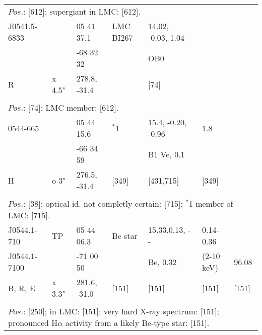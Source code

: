 \documentclass{aa}
\begin{document}
\begin{table*}[h]
\begin{tabular}{p{2.5cm}p{1cm}p{1.8cm}p{2.3cm}p{3.3cm}p{2.0cm}p{2.2cm}}
\\
\multicolumn{7}{p{17.5cm}}{
$Pos$.: [612]; supergiant in LMC: [612].    }\\

\noalign{\smallskip}
\hline
\noalign{\smallskip}
J0541.5-6833    &                &  05 41 37.1    & LMC BI267    & 14.02, -0.03,-1.04   &  &  \\
                             &                & -68 32 32       &                          & OB0                         &      &   \\                                 
     R                     & x 4.5"    & 278.8, -31.4   &                           &       [74]                       &   &   \\
  
\\
\multicolumn{7}{p{17.5cm}}{
$Pos$.: [74]; LMC member: [612].      }\\

\noalign{\smallskip}
\hline
\noalign{\smallskip}
 0544-665     &             & 05 44 15.6     & $^*$1        & 15.4, -0.20, -0.96  &  1.8         &           \\
                       &             & -66 34 59       &                   & B1 Ve, 0.1             &                 &           \\
H                    &  o 3"   & 276.5, -31.4   &  [349]        &    [431,715]          &  [349]     &           \\
\\
\multicolumn{7}{p{17.5cm}}{
$Pos$.: [38]; optical id. not completly certain: [715]; $^*$1 member of LMC: [715].}\\

\noalign{\smallskip}
\hline
\noalign{\smallskip}
J0544.1-710   &   TP        &  05 44 06.3   &  Be star   & 15.33,0.13, - -  &    0.14-0.36              &             \\
J0544.1-7100 &                & -71 00 50      &                    &  Be, 0.32          &    (2-10 keV)             & 96.08  \\
B, R, E             &  x 3.3"   & 281.6, -31.0   & [151]              & [151]             &      [151]                     &   [151]    \\
  
\\
\multicolumn{7}{p{17.5cm}}{
$Pos$.: [250]; in LMC: [151]; very hard X-ray spectrum: [151]; pronounced H$\alpha$ activity from a likely 
Be-type star: [151].  }\\
  

\end{tabular}
\end{table*}
\end{document}
